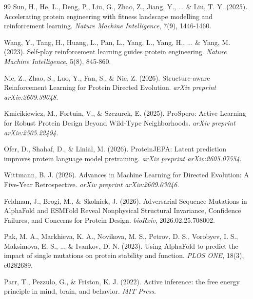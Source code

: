 \documentclass[12pt, a4paper]{article}
\begin{document}
\begin{thebibliography}{99}
Sun, H., He, L., Deng, P., Liu, G., Zhao, Z., Jiang, Y., ... \& Liu, T. Y. (2025). \newblock Accelerating protein engineering with fitness landscape modelling and reinforcement learning. \newblock \textit{Nature Machine Intelligence}, 7(9), 1446-1460.


Wang, Y., Tang, H., Huang, L., Pan, L., Yang, L., Yang, H., ... \& Yang, M. (2023). \newblock Self-play reinforcement learning guides protein engineering. \newblock \textit{Nature Machine Intelligence}, 5(8), 845-860.


Nie, Z., Zhao, S., Luo, Y., Fan, S., \& Nie, Z. (2026). \newblock Structure-aware Reinforcement Learning for Protein Directed Evolution. \newblock \textit{arXiv preprint arXiv:2609.39048}.


Kmicikiewicz, M., Fortuin, V., \& Szczurek, E. (2025). \newblock ProSpero: Active Learning for Robust Protein Design Beyond Wild-Type Neighborhoods. \newblock \textit{arXiv preprint arXiv:2505.22494}.


Ofer, D., Shahaf, D., \& Linial, M. (2026). \newblock ProteinJEPA: Latent prediction improves protein language model pretraining. \newblock \textit{arXiv preprint arXiv:2605.07554}.


Wittmann, B. J. (2026). \newblock Advances in Machine Learning for Directed Evolution: A Five-Year Retrospective. \newblock \textit{arXiv preprint arXiv:2609.03046}.


Feldman, J., Brogi, M., \& Skolnick, J. (2026). \newblock Adversarial Sequence Mutations in AlphaFold and ESMFold Reveal Nonphysical Structural Invariance, Confidence Failures, and Concerns for Protein Design. \newblock \textit{bioRxiv}, 2026.02.25.708002.


Pak, M. A., Markhieva, K. A., Novikova, M. S., Petrov, D. S., Vorobyev, I. S., Maksimova, E. S., ... \& Ivankov, D. N. (2023). \newblock Using AlphaFold to predict the impact of single mutations on protein stability and function. \newblock \textit{PLOS ONE}, 18(3), e0282689.


Parr, T., Pezzulo, G., \& Friston, K. J. (2022). \newblock Active inference: the free energy principle in mind, brain, and behavior. \newblock \textit{MIT Press}.



\end{thebibliography}
\end{document}
